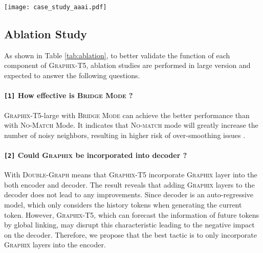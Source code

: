 \documentclass[letterpaper]{article} \usepackage{aaai23}  \usepackage{times}  \usepackage{helvet}  \usepackage{courier}  \usepackage[hyphens]{url}  \usepackage{graphicx} \usepackage{amsmath}
\newcommand{\graphix}{\textsc{Graphix}\xspace}
\begin{document}
\begin{figure*}
    \centering
    \texttt{[image: case\_study\_aaai.pdf]}
    \caption{Case study: two illustrative cases sampled randomly from \textsc{Syn}. It shows that multi-hop reasoning can help \graphix-T5 generate more correct SQLs in terms of semantic meanings and database schema structures.}
    \label{case}
    \vspace{-0.3cm}
\end{figure*}

\subsection{Ablation Study}
As shown in Table \ref{tab:ablation}, to better validate the function of each component of \graphix-T5, ablation studies are performed in large version and expected to answer the following questions.
\paragraph{\texttt{[1]} How effective is \textsc{Bridge Mode} ?} \graphix-T5-large with \textsc{Bridge Mode} can achieve the better performance than with \textsc{No-Match} Mode. It indicates that \textsc{No-match} mode will greatly increase the number of noisy neighbors, resulting in higher risk of over-smoothing issues \citep{over-smoothing}.

\paragraph{\texttt{[2]} Could \graphix be incorporated into decoder ?} With \textsc{Double-Graph} means that \graphix-T5 incorporate \graphix layer into the both encoder and decoder. The result reveals that adding \graphix layers to the decoder does not lead to any improvements.  Since decoder is an auto-regressive model, which only considers the history tokens when generating the current token. However, \graphix-T5, which can forecast the information of future tokens by global linking, may disrupt this characteristic leading to the negative impact on the decoder. Therefore, we propose that the best tactic is to only incorporate \graphix layers into the encoder.
\end{document}
